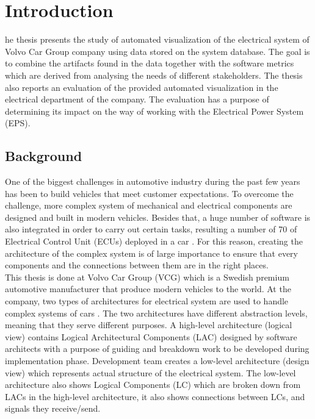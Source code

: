 \chapter{Introduction}
\lettrine[findent=2pt]{}{ }he thesis presents the study of automated visualization of the electrical system of Volvo Car Group company using data stored on the system database. The goal is to combine the artifacts found in the data together with the software metrics which are derived from analysing the needs of different stakeholders. The thesis also reports an evaluation of the provided automated visualization in the electrical department of the company. The evaluation has a purpose of determining its impact on the way of working with the Electrical Power System (EPS). 

\section{Background}\label{Background_ref}
One of the biggest challenges in automotive industry during the past few years has been to build vehicles that meet customer expectations. To overcome the challenge, more complex system of mechanical and electrical components are designed and built in modern vehicles. Besides that, a huge number of software is also integrated in order to carry out certain tasks, resulting a number of 70 of Electrical Control Unit (ECUs) deployed in a car \cite{Beeck}. For this reason, creating the architecture of the complex system is of large importance to ensure that every components and the connections between them are in the right places. \\

This thesis is done at Volvo Car Group (VCG) which is a Swedish premium automotive manufacturer that produce modern vehicles to the world. At the company, two types of architectures for electrical system are used to handle complex systems of cars \cite{Eliasson_1}. The two architectures have different abstraction levels, meaning that they serve different purposes. A high-level architecture (logical view) contains Logical Architectural Components (LAC) designed by software architects with a purpose of guiding and breakdown work to be developed during implementation phase. Development team creates a low-level architecture (design view) which represents actual structure of the electrical system. The low-level architecture also shows Logical Components (LC) which are broken down from LACs in the high-level architecture, it also shows connections between LCs, and signals they receive/send. \\

